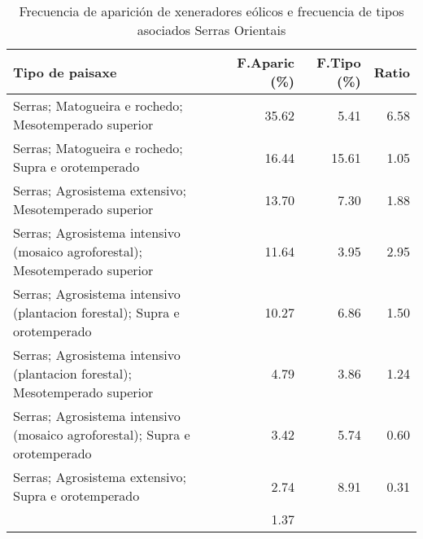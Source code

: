 \begin{table}[p]
\centering
\caption{Frecuencia de aparición de xeneradores eólicos e frecuencia de tipos asociados Serras Orientais} 
\label{veolico5}
\begin{tabular}{lrrr}
  \hline
Tipo de paisaxe & F.Aparic (\%) & F.Tipo (\%) & Ratio \\ 
  \hline
Serras; Matogueira e rochedo; Mesotemperado superior & 35.62 & 5.41 & 6.58 \\ 
  Serras; Matogueira e rochedo; Supra e orotemperado & 16.44 & 15.61 & 1.05 \\ 
  Serras; Agrosistema extensivo; Mesotemperado superior & 13.70 & 7.30 & 1.88 \\ 
  Serras; Agrosistema intensivo (mosaico agroforestal); Mesotemperado superior & 11.64 & 3.95 & 2.95 \\ 
  Serras; Agrosistema intensivo (plantacion forestal); Supra e orotemperado & 10.27 & 6.86 & 1.50 \\ 
  Serras; Agrosistema intensivo (plantacion forestal); Mesotemperado superior & 4.79 & 3.86 & 1.24 \\ 
  Serras; Agrosistema intensivo (mosaico agroforestal); Supra e orotemperado & 3.42 & 5.74 & 0.60 \\ 
  Serras; Agrosistema extensivo; Supra e orotemperado & 2.74 & 8.91 & 0.31 \\ 
   & 1.37 &  &  \\ 
   \hline
\end{tabular}
\end{table}
